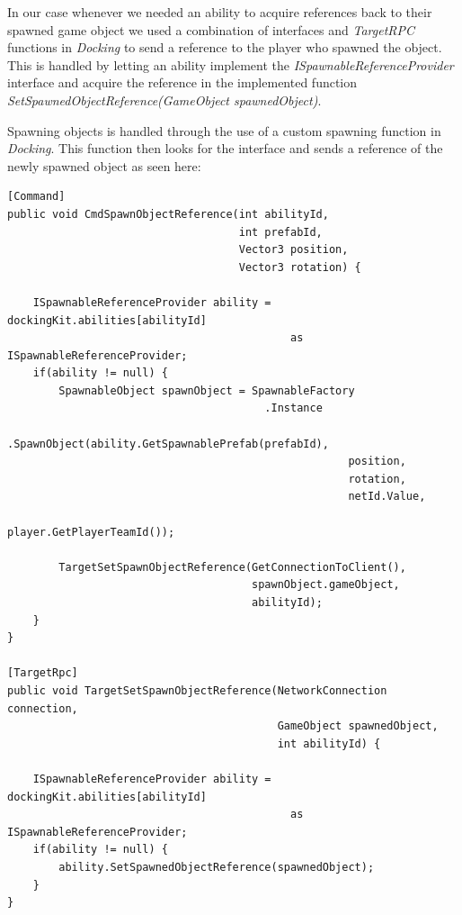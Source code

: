 In our case whenever we needed an ability to acquire references back to their spawned game object we used a combination of interfaces and \emph{TargetRPC} functions in \emph{Docking} to send a reference to the player who spawned the object. This is handled by letting an ability implement the \emph{ISpawnableReferenceProvider} interface and acquire the reference in the implemented function \emph{SetSpawnedObjectReference(GameObject spawnedObject)}. 

Spawning objects is handled through the use of a custom spawning function in \emph{Docking}. This function then looks for the interface and sends a reference of the newly spawned object as seen here:

\begin{verbatim}
[Command]
public void CmdSpawnObjectReference(int abilityId, 
                                    int prefabId, 
                                    Vector3 position, 
                                    Vector3 rotation) {
    
    ISpawnableReferenceProvider ability = dockingKit.abilities[abilityId] 
                                            as ISpawnableReferenceProvider;
    if(ability != null) {
        SpawnableObject spawnObject = SpawnableFactory
                                        .Instance
                                        .SpawnObject(ability.GetSpawnablePrefab(prefabId), 
                                                     position, 
                                                     rotation, 
                                                     netId.Value, 
                                                     player.GetPlayerTeamId());
        
        TargetSetSpawnObjectReference(GetConnectionToClient(), 
                                      spawnObject.gameObject, 
                                      abilityId);
    }
}

[TargetRpc]
public void TargetSetSpawnObjectReference(NetworkConnection connection, 
                                          GameObject spawnedObject, 
                                          int abilityId) {
    
    ISpawnableReferenceProvider ability = dockingKit.abilities[abilityId] 
                                            as ISpawnableReferenceProvider;
    if(ability != null) {
        ability.SetSpawnedObjectReference(spawnedObject);
    }
}
\end{verbatim}


